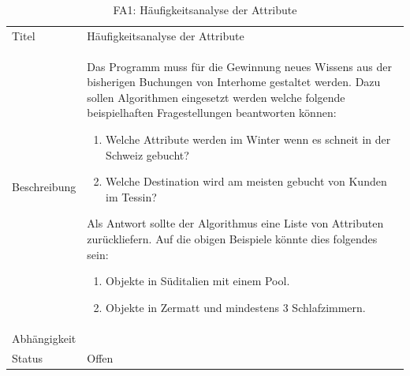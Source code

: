 \begin{table}[H] 
	\caption{FA1: Häufigkeitsanalyse der Attribute}
	\centering
	\label{fig:anforderungsanalyse:funktionaleanforderung:fa1}
	\begin{tabular}{ | l | L{10cm} | } 
		\hline 
		 \\ \hline 
		Titel & Häufigkeitsanalyse der Attribute \\ \hline 
		Beschreibung & Das Programm muss für die Gewinnung neues Wissens aus der bisherigen Buchungen von Interhome gestaltet werden. Dazu sollen Algorithmen eingesetzt werden welche folgende beispielhaften Fragestellungen beantworten können:
		\begin{enumerate}
		\item Welche Attribute werden im Winter wenn es schneit in der Schweiz gebucht?
		\item Welche Destination wird am meisten gebucht von Kunden im Tessin?
		\end{enumerate}
		
		Als Antwort sollte der Algorithmus eine Liste von Attributen zurückliefern. Auf die obigen Beispiele könnte dies folgendes sein:
		\begin{enumerate}
		\item Objekte in Süditalien mit einem Pool.
		\item Objekte in Zermatt und mindestens 3 Schlafzimmern.
		\end{enumerate} \\ \hline 
		Abhängigkeit & \\ \hline 
		Status & Offen \\ \hline 
	\end{tabular}
\end{table}


